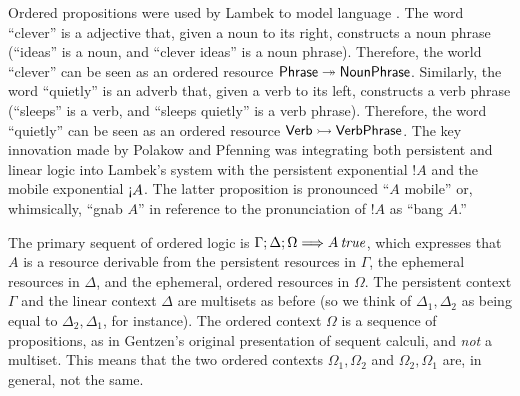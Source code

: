 Ordered propositions were used by Lambek to model language
\cite{lambek58mathematics}. The word ``clever'' is a adjective that,
given a noun to its right, constructs a noun phrase (``ideas''
is a noun, and ``clever ideas'' is a noun phrase). Therefore, the world
``clever'' can be seen as an ordered resource ${\sf Phrase \twoheadrightarrow
  NounPhrase}$. Similarly, the word ``quietly'' is an adverb that,
given a verb to its left, constructs a verb phrase (``sleeps''
is a verb, and ``sleeps quietly'' is a verb phrase). Therefore, the word
``quietly'' can be seen as an ordered resource ${\sf Verb \rightarrowtail
  VerbPhrase}$. The key innovation made by Polakow and Pfenning was
integrating both persistent and linear logic into Lambek's system with
the persistent exponential ${!}A$ and the mobile exponential
${\gnab}A$. The latter proposition is pronounced ``$A$ mobile'' or,
whimsically, ``gnab $A$'' in reference to the pronunciation of ${!}A$
as ``bang $A$.''
 
The primary sequent of ordered logic is
${\Gamma};{\Delta};{\Omega} \Longrightarrow {{A}\,{{\it true}}} \mathstrut$, which expresses that $A$
is a resource derivable from the persistent resources in $\Gamma$,
the ephemeral resources in $\Delta$, and the ephemeral, ordered
resources in $\Omega$. The persistent context $\Gamma$ and the linear
context $\Delta$ are multisets as before (so we think of $\Delta_1,
\Delta_2$ as being equal to $\Delta_2, \Delta_1$, for instance). The
ordered context $\Omega$ is a sequence of propositions, as in
Gentzen's original presentation of sequent calculi, and {\it not} a
multiset.  This means that the two ordered contexts $\Omega_1,
\Omega_2$ and $\Omega_2, \Omega_1$ are, in general, not the same.

